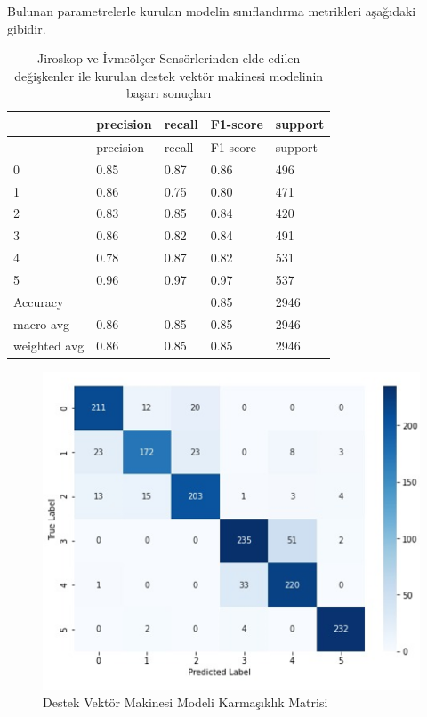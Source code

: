 \documentclass[12pt,twoside]{deuthesis}
\begin{document}
Bulunan parametrelerle kurulan modelin sınıflandırma metrikleri aşağıdaki gibidir.
\begin{longtable}[]{@{}lllll@{}}
\caption{\label{tab:jisvm} Jiroskop ve İvmeölçer Sensörlerinden elde edilen değişkenler ile kurulan destek vektör makinesi modelinin başarı sonuçları}\tabularnewline
\toprule()
& precision & recall & F1-score & support \\
\midrule()
\endfirsthead
\toprule()
& precision & recall & F1-score & support \\
\midrule()
\endhead
0 & 0.85 & 0.87 & 0.86 & 496 \\
1 & 0.86 & 0.75 & 0.80 & 471 \\
2 & 0.83 & 0.85 & 0.84 & 420 \\
3 & 0.86 & 0.82 & 0.84 & 491 \\
4 & 0.78 & 0.87 & 0.82 & 531 \\
5 & 0.96 & 0.97 & 0.97 & 537 \\
Accuracy & & & 0.85 & 2946 \\
macro avg & 0.86 & 0.85 & 0.85 & 2946 \\
weighted avg & 0.86 & 0.85 & 0.85 & 2946 \\
\bottomrule()
\end{longtable}
\begin{figure}

{\centering \includegraphics[width=0.9\linewidth,height=0.35\textheight]{figure/jisvm_confmat} 

}

\caption{Destek Vektör Makinesi Modeli Karmaşıklık Matrisi}\label{fig:jisvmconfmat}
\end{figure}
\end{document}
